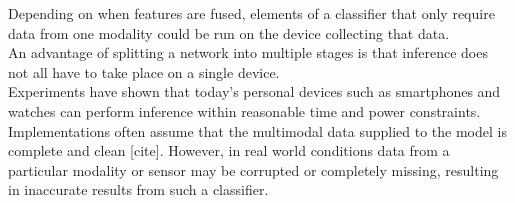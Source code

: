 Depending on when features are fused, elements of a classifier that only require data from one modality could be run on the device collecting that data.\\

An advantage of splitting a network into multiple stages is that inference does not all have to take place on a single device.\\

Experiments \cite{RaduMultimodal,CNNwatch,snapdragon} have shown that today's personal devices such as smartphones and watches can perform inference within reasonable time and power constraints.\\

Implementations often assume that the multimodal data supplied to the model is complete and clean [cite]. However, in real world conditions data from a particular modality or sensor may be corrupted or completely missing, resulting in inaccurate results from such a classifier.\\
